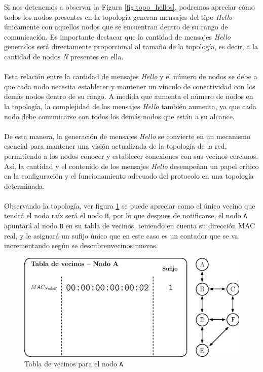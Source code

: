 Si nos detenemos a observar la Figura \ref{fig:topo_hellos}, podremos apreciar cómo todos los nodos presentes en la topología generan mensajes del tipo \textit{Hello} únicamente con aquellos nodos que se encuentran dentro de su rango de comunicación. Es importante destacar que la cantidad de mensajes \textit{Hello} generados será directamente proporcional al tamaño de la topología, es decir, a la cantidad de nodos \textit{N} presentes en ella.\\
\\
Esta relación entre la cantidad de mensajes \textit{Hello} y el número de nodos se debe a que cada nodo necesita establecer y mantener un vínculo de conectividad con los demás nodos dentro de su rango. A medida que aumenta el número de nodos en la topología, la complejidad de los mensajes \textit{Hello} también aumenta, ya que cada nodo debe comunicarse con todos los demás nodos que están a su alcance.\\
\\
De esta manera, la generación de mensajes \textit{Hello} se convierte en un mecanismo esencial para mantener una visión actualizada de la topología de la red, permitiendo a los nodos conocer y establecer conexiones con sus vecinos cercanos. Así, la cantidad y el contenido de los mensajes \textit{Hello} desempeñan un papel crítico en la configuración y el funcionamiento adecuado del protocolo en una topología determinada.\\
\\
Observando la topología, ver figura \ref{fig:topo_hello_nodoA_nb} se puede apreciar como el único vecino que tendrá el nodo raíz será el nodo \texttt{B}, por lo que despues de notificarse, el nodo \texttt{A} apuntará al nodo \texttt{B} en su tabla de vecinos, teniendo en cuenta su dirección MAC real, y le asignará un sufijo único que en este caso es un contador que se va incrementando según se descubrenvecinos nuevos.\\

\begin{figure}[ht!]
    \centering
    \includegraphics[width=\textwidth]{archivos/img/dev/topo_hello_nodoA_nb.eps}
    \caption{Tabla de vecinos para el nodo \texttt{A}}
    \label{fig:topo_hello_nodoA_nb}
\end{figure}

